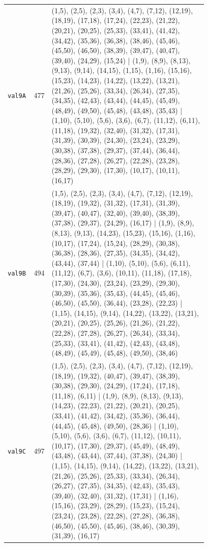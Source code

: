 \begin{landscape}
\begin{longtable}{lr>{\tiny\raggedright\arraybackslash}p{0.78\linewidth}}
\texttt{val9A} & 477 & (1,5), (2,5), (2,3), (3,4), (4,7), (7,12), (12,19), (18,19), (17,18), (17,24), (22,23), (21,22), (20,21), (20,25), (25,33), (33,41), (41,42), (34,42), (35,36), (36,38), (38,46), (45,46), (45,50), (46,50), (38,39), (39,47), (40,47), (39,40), (24,29), (15,24) | (1,9), (8,9), (8,13), (9,13), (9,14), (14,15), (1,15), (1,16), (15,16), (15,23), (14,23), (14,22), (13,22), (13,21), (21,26), (25,26), (33,34), (26,34), (27,35), (34,35), (42,43), (43,44), (44,45), (45,49), (48,49), (49,50), (45,48), (43,48), (35,43) | (1,10), (5,10), (5,6), (3,6), (6,7), (11,12), (6,11), (11,18), (19,32), (32,40), (31,32), (17,31), (31,39), (30,39), (24,30), (23,24), (23,29), (30,38), (37,38), (29,37), (37,44), (36,44), (28,36), (27,28), (26,27), (22,28), (23,28), (28,29), (29,30), (17,30), (10,17), (10,11), (16,17) \\[2pt]
\texttt{val9B} & 494 & (1,5), (2,5), (2,3), (3,4), (4,7), (7,12), (12,19), (18,19), (19,32), (31,32), (17,31), (31,39), (39,47), (40,47), (32,40), (39,40), (38,39), (37,38), (29,37), (24,29), (16,17) | (1,9), (8,9), (8,13), (9,13), (14,23), (15,23), (15,16), (1,16), (10,17), (17,24), (15,24), (28,29), (30,38), (36,38), (28,36), (27,35), (34,35), (34,42), (43,44), (37,44) | (1,10), (5,10), (5,6), (6,11), (11,12), (6,7), (3,6), (10,11), (11,18), (17,18), (17,30), (24,30), (23,24), (23,29), (29,30), (30,39), (35,36), (35,43), (44,45), (45,46), (46,50), (45,50), (36,44), (23,28), (22,23) | (1,15), (14,15), (9,14), (14,22), (13,22), (13,21), (20,21), (20,25), (25,26), (21,26), (21,22), (22,28), (27,28), (26,27), (26,34), (33,34), (25,33), (33,41), (41,42), (42,43), (43,48), (48,49), (45,49), (45,48), (49,50), (38,46) \\[2pt]
\texttt{val9C} & 497 & (1,5), (2,5), (2,3), (3,4), (4,7), (7,12), (12,19), (18,19), (19,32), (40,47), (39,47), (38,39), (30,38), (29,30), (24,29), (17,24), (17,18), (11,18), (6,11) | (1,9), (8,9), (8,13), (9,13), (14,23), (22,23), (21,22), (20,21), (20,25), (33,41), (41,42), (34,42), (35,36), (36,44), (44,45), (45,48), (49,50), (28,36) | (1,10), (5,10), (5,6), (3,6), (6,7), (11,12), (10,11), (10,17), (17,30), (29,37), (45,49), (48,49), (43,48), (43,44), (37,44), (37,38), (24,30) | (1,15), (14,15), (9,14), (14,22), (13,22), (13,21), (21,26), (25,26), (25,33), (33,34), (26,34), (26,27), (27,35), (34,35), (42,43), (35,43), (39,40), (32,40), (31,32), (17,31) | (1,16), (15,16), (23,29), (28,29), (15,23), (15,24), (23,24), (23,28), (22,28), (27,28), (36,38), (46,50), (45,50), (45,46), (38,46), (30,39), (31,39), (16,17) \\[2pt]

\end{longtable}
\end{landscape}
